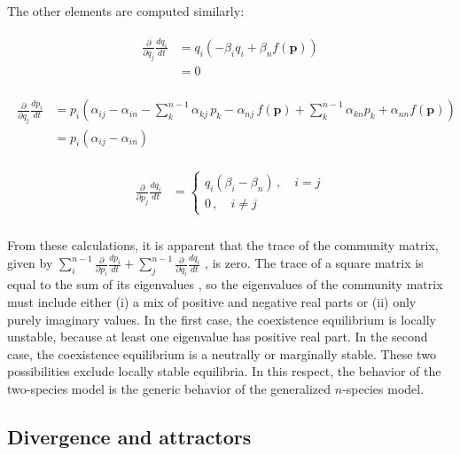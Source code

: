 \documentclass[11pt]{article}
\begin{document}
The other elements are computed similarly:

\begin{align}
\begin{split} 
\frac{\partial}{\partial q_j} \frac{dq_i}{dt} &= q_i \left( - \beta_i q_i + \beta_n f(\bm{p}) \right) \\
&= 0
\end{split}
\end{align}

\begin{align}
\begin{split} 
\frac{\partial}{\partial q_j} \frac{dp_i}{dt} &= p_i \left(\alpha_{ij} - \alpha_{in} - \sum_{k}^{n-1} \alpha_{kj} \, p_k - \alpha_{nj} \, f(\bm{p}) + \sum_{k}^{n-1} \alpha_{kn} p_k + \alpha_{nn} f(\bm{p}) \right) \\
&= p_i(\alpha_{ij} - \alpha_{in})
\end{split}
\end{align}

\begin{align} \label{lastblock}
\begin{split} 
\frac{\partial}{\partial p_j} \frac{dq_i}{dt} &= 
\begin{cases}
q_i \left(\beta_{i} - \beta_{n} \right) \, , \quad i = j\\
0 \, , \quad i \neq j
\end{cases} \\
\end{split}
\end{align}

From these calculations, it is apparent that the trace of the community matrix, given by $\sum_i^{n-1} \frac{\partial}{\partial p_i} \frac{dp_i}{dt} + \sum_j^{n-1} \frac{\partial}{\partial q_i} \frac{dq_i}{dt}$ , is zero. The trace of a square matrix is equal to the sum of its eigenvalues \cite{horn2012matrix}, so the eigenvalues of the community matrix must include either (i) a mix of positive and negative real parts or (ii) only purely imaginary values. In the first case, the coexistence equilibrium is locally unstable, because at least one eigenvalue has positive real part. In the second case, the coexistence equilibrium is a neutrally or marginally stable. These two possibilities exclude locally stable equilibria. In this respect, the behavior of the two-species model is the generic behavior of the generalized $n$-species model.

\subsection{Divergence and attractors}
\end{document}
